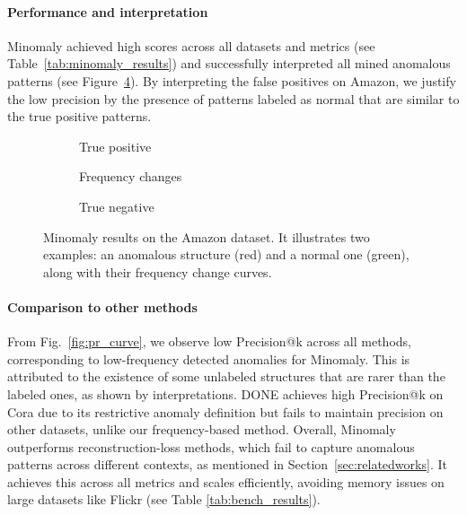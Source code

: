 \documentclass[pdflatex,sn-mathphys-num]{sn-jnl}%
\theoremstyle{thmstyleone}%
\theoremstyle{thmstyletwo}%
\theoremstyle{thmstylethree}%
\begin{document}
\vspace*{-30pt}
\paragraph{Performance and interpretation}
Minomaly achieved high scores across all datasets and metrics (see Table~\ref{tab:minomaly_results}) and successfully interpreted all mined anomalous patterns (see Figure~\ref{fig:interpret_results}). By interpreting the false positives on Amazon, we justify the low precision by the presence of patterns labeled as normal that are similar to the true positive patterns.

\begin{figure}[H]
    \centering
    \begin{subfigure}{0.2\textwidth}
        \resizebox{\linewidth}{!}{}
        \caption{True positive}
        \label{fig:true_positive}
    \end{subfigure}
    \hfill
    \begin{subfigure}{0.3\textwidth}
        \resizebox{\linewidth}{!}{}
        \caption{Frequency changes}
        \label{fig:frequency_track}
    \end{subfigure}
    \hfill
    \begin{subfigure}{0.2\textwidth}
        \resizebox{\linewidth}{!}{}
        \caption{True negative}
        \label{fig:false_positive}
    \end{subfigure}
    \caption{\small Minomaly results on the Amazon dataset. It illustrates two examples: an anomalous structure (red) and a normal one (green), along with their frequency change curves.}
    \label{fig:interpret_results}
\end{figure}

\vspace*{-20pt}
\paragraph{Comparison to other methods}
From Fig.~\ref{fig:pr_curve}, we observe low Precision@k %
across all methods, corresponding to low-frequency detected anomalies for Minomaly. This is attributed to the existence of some unlabeled structures that are rarer than the labeled ones, as shown by interpretations. DONE achieves high Precision@k on Cora due to its restrictive anomaly definition but fails to maintain precision on other datasets, unlike our frequency-based method. Overall, Minomaly outperforms reconstruction-loss methods, which fail to capture anomalous patterns across different contexts, as mentioned in Section~\ref{sec:relatedworks}. It achieves this across all metrics and scales efficiently, avoiding memory issues on large datasets like Flickr (see Table \ref{tab:bench_results}).
\end{document}
